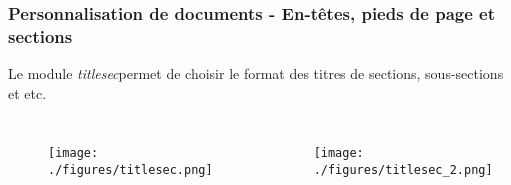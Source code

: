 \begin{frame}
    \frametitle{Personnalisation de documents - En-têtes, pieds de page et sections}
    Le module \textcolor{vibrant_green}{\textit{titlesec}}\footnotemark permet de choisir le format des titres de sections, sous-sections et etc.
    \begin{columns}
        \begin{figure}
           \centering
            \texttt{[image: ./figures/titlesec.png]}
            \label{fig: titlesec}
        \end{figure}
        \begin{figure}
           \centering
            \texttt{[image: ./figures/titlesec\_2.png]}
            \label{fig: titlesec_2}
        \end{figure}
    \end{columns}
\end{frame}

